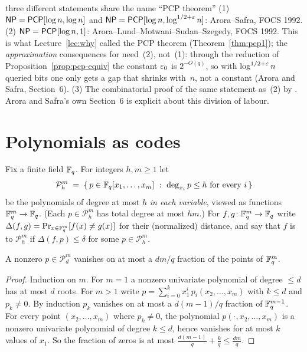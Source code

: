 \begin{pitfall}{three different statements share the name ``PCP theorem''}
(1) $\mathsf{NP}=\mathsf{PCP}[\log n,\log n]$ and $\mathsf{NP}=\mathsf{PCP}[\log n,\log^{1/2+\varepsilon}n]$: Arora--Safra, FOCS 1992.
(2) $\mathsf{NP}=\mathsf{PCP}[\log n,1]$: Arora--Lund--Motwani--Sudan--Szegedy, FOCS 1992.  This is what Lecture~\ref{lec:why} called the PCP theorem
(Theorem~\ref{thm:pcp1}); the \emph{approximation} consequences for  need~(2), not~(1): through the reduction of Proposition~\ref{prop:pcp-equiv} the constant $\varepsilon_0$ is $2^{-O(q)}$, so with
$\log^{1/2+\varepsilon}n$ queried bits one only gets a gap that shrinks with~$n$, not a constant (Arora and Safra, Section~6).
(3) The combinatorial proof of the same statement as~(2) by \citet{Dinur07}.
Arora and Safra's own Section~6 is explicit about this division of labour.
\end{pitfall}


\section{Polynomials as codes}
\label{sec:poly}

Fix a finite field $\mathbb{F}_q$.  For integers $h,m\ge1$ let
\[
  \mathcal P^m_h\;=\;\{\,p\in\mathbb{F}_q[x_1,\dots,x_m]\ :\ \deg_{x_i}p\le h\text{ for every }i\,\}
\]
be the polynomials of degree at most $h$ \emph{in each variable}, viewed as functions $\mathbb{F}_q^m\to\mathbb{F}_q$.  (Each $p\in\mathcal P^m_h$ has total degree at most $hm$.)
For $f,g\colon\mathbb{F}_q^m\to\mathbb{F}_q$ write $\Delta(f,g)=\Pr_{x\in\mathbb{F}_q^m}[f(x)\ne g(x)]$ for their (normalized) distance, and say that $f$ is
 to $\mathcal P^m_h$ if $\Delta(f,p)\le\delta$ for some $p\in\mathcal P^m_h$.

\begin{lemma}\label{lem:sz}
A nonzero $p\in\mathcal P^m_d$ vanishes on at most a $dm/q$ fraction of the points of $\mathbb{F}_q^m$.
\end{lemma}
\begin{proof}
Induction on $m$.  For $m=1$ a nonzero univariate polynomial of degree $\le d$ has at most $d$ roots.
For $m>1$ write $p=\sum_{i=0}^{k}x_1^i\,p_i(x_2,\dots,x_m)$ with $k\le d$ and $p_k\ne0$.  By induction $p_k$ vanishes on at most a
$d(m-1)/q$ fraction of $\mathbb{F}_q^{m-1}$.  For every point $(x_2,\dots,x_m)$ where $p_k\ne0$, the polynomial $p(\cdot,x_2,\dots,x_m)$ is a
nonzero univariate polynomial of degree $k\le d$, hence vanishes for at most $k$ values of $x_1$.  So the fraction of zeros is at most
$\frac{d(m-1)}q+\frac kq\le\frac{dm}q$.
\end{proof}

